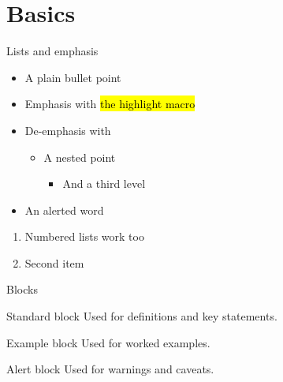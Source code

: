 \section{Basics}

\begin{frame}{Lists and emphasis}
  \begin{itemize}
    \item A plain bullet point
    \item Emphasis with \hl{the highlight macro}
    \item De-emphasis with 
      \begin{itemize}
        \item A nested point
          \begin{itemize}
            \item And a third level
          \end{itemize}
      \end{itemize}
    \item An \alert{alerted} word
  \end{itemize}

  \begin{enumerate}
    \item Numbered lists work too
    \item Second item
  \end{enumerate}
\end{frame}

\begin{frame}{Blocks}
  \begin{block}{Standard block}
    Used for definitions and key statements.
  \end{block}

  \begin{exampleblock}{Example block}
    Used for worked examples.
  \end{exampleblock}

  \begin{alertblock}{Alert block}
    Used for warnings and caveats.
  \end{alertblock}
\end{frame}

